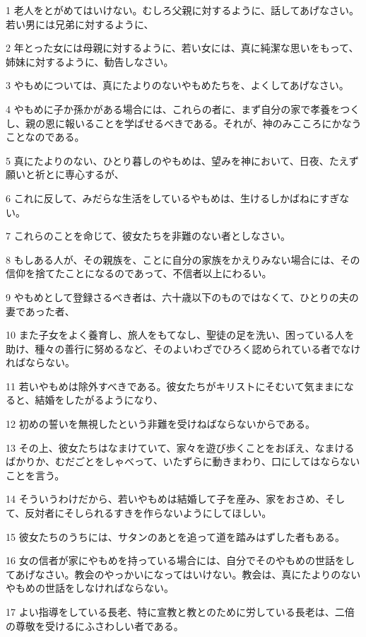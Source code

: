 \par 1 老人をとがめてはいけない。むしろ父親に対するように、話してあげなさい。若い男には兄弟に対するように、
\par 2 年とった女には母親に対するように、若い女には、真に純潔な思いをもって、姉妹に対するように、勧告しなさい。
\par 3 やもめについては、真にたよりのないやもめたちを、よくしてあげなさい。
\par 4 やもめに子か孫かがある場合には、これらの者に、まず自分の家で孝養をつくし、親の恩に報いることを学ばせるべきである。それが、神のみこころにかなうことなのである。
\par 5 真にたよりのない、ひとり暮しのやもめは、望みを神において、日夜、たえず願いと祈とに専心するが、
\par 6 これに反して、みだらな生活をしているやもめは、生けるしかばねにすぎない。
\par 7 これらのことを命じて、彼女たちを非難のない者としなさい。
\par 8 もしある人が、その親族を、ことに自分の家族をかえりみない場合には、その信仰を捨てたことになるのであって、不信者以上にわるい。
\par 9 やもめとして登録さるべき者は、六十歳以下のものではなくて、ひとりの夫の妻であった者、
\par 10 また子女をよく養育し、旅人をもてなし、聖徒の足を洗い、困っている人を助け、種々の善行に努めるなど、そのよいわざでひろく認められている者でなければならない。
\par 11 若いやもめは除外すべきである。彼女たちがキリストにそむいて気ままになると、結婚をしたがるようになり、
\par 12 初めの誓いを無視したという非難を受けねばならないからである。
\par 13 その上、彼女たちはなまけていて、家々を遊び歩くことをおぼえ、なまけるばかりか、むだごとをしゃべって、いたずらに動きまわり、口にしてはならないことを言う。
\par 14 そういうわけだから、若いやもめは結婚して子を産み、家をおさめ、そして、反対者にそしられるすきを作らないようにしてほしい。
\par 15 彼女たちのうちには、サタンのあとを追って道を踏みはずした者もある。
\par 16 女の信者が家にやもめを持っている場合には、自分でそのやもめの世話をしてあげなさい。教会のやっかいになってはいけない。教会は、真にたよりのないやもめの世話をしなければならない。
\par 17 よい指導をしている長老、特に宣教と教とのために労している長老は、二倍の尊敬を受けるにふさわしい者である。
